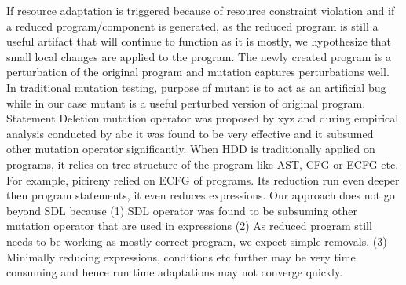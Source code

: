 
If resource adaptation is triggered because of resource constraint violation and if a reduced program/component is generated, as the reduced program is still a useful artifact that will continue to function as it is mostly, we hypothesize that small local changes are applied to the program. The newly created program is a perturbation of the original program and mutation captures perturbations well. In traditional mutation testing, purpose of mutant is to act as an artificial bug while in our case mutant is a useful perturbed version of original program. Statement Deletion mutation operator was proposed by xyz and during empirical analysis conducted by abc it was found to be very effective and it subsumed other mutation operator significantly. When HDD is traditionally applied on programs, it relies on tree structure of the program like AST, CFG or ECFG etc. For example, picireny relied on ECFG of programs. Its reduction run even deeper then program statements, it even reduces expressions. Our approach does not go beyond SDL because (1) SDL operator was found to be subsuming other mutation operator that are used in expressions (2) As reduced program still needs to be working as mostly correct program, we expect simple removals. (3) Minimally reducing expressions, conditions etc further may be very time consuming and hence run time adaptations may not converge quickly.

   